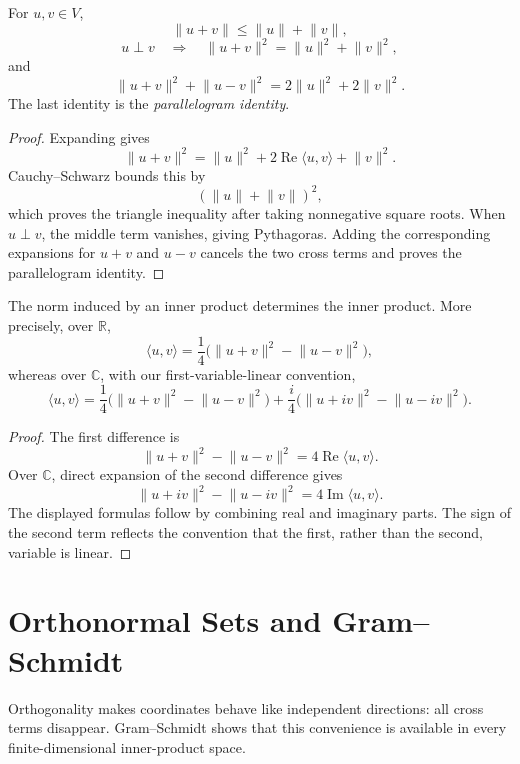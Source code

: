 \begin{proposition}
For \(u,v\in V\),
\[
\lVert u+v\rVert\leq\lVert u\rVert+\lVert v\rVert,
\]
\[
u\perp v
\quad\Longrightarrow\quad
\lVert u+v\rVert^2=\lVert u\rVert^2+\lVert v\rVert^2,
\]
and
\[
\lVert u+v\rVert^2+\lVert u-v\rVert^2
=2\lVert u\rVert^2+2\lVert v\rVert^2.
\]
The last identity is the \emph{parallelogram identity}.
\end{proposition}
\begin{proof}
Expanding gives
\[
\lVert u+v\rVert^2
=\lVert u\rVert^2+2\operatorname{Re}\langle u,v\rangle+\lVert v\rVert^2.
\]
Cauchy--Schwarz bounds this by
\[
(\lVert u\rVert+\lVert v\rVert)^2,
\]
which proves the triangle inequality after taking nonnegative square roots.
When \(u\perp v\), the middle term vanishes, giving Pythagoras. Adding the
corresponding expansions for \(u+v\) and \(u-v\) cancels the two cross terms
and proves the parallelogram identity.
\end{proof}

\begin{proposition}[Polarization]
The norm induced by an inner product determines the inner product. More
precisely, over \(\mathbb R\),
\[
\langle u,v\rangle
=\frac14\bigl(\lVert u+v\rVert^2-\lVert u-v\rVert^2\bigr),
\]
whereas over \(\mathbb C\), with our first-variable-linear convention,
\[
\langle u,v\rangle
=\frac14\bigl(\lVert u+v\rVert^2-\lVert u-v\rVert^2\bigr)
+\frac{i}{4}\bigl(\lVert u+iv\rVert^2-\lVert u-iv\rVert^2\bigr).
\]
\end{proposition}
\begin{proof}
The first difference is
\[
\lVert u+v\rVert^2-\lVert u-v\rVert^2
=4\operatorname{Re}\langle u,v\rangle.
\]
Over \(\mathbb C\), direct expansion of the second difference gives
\[
\lVert u+iv\rVert^2-\lVert u-iv\rVert^2
=4\operatorname{Im}\langle u,v\rangle.
\]
The displayed formulas follow by combining real and imaginary parts. The
sign of the second term reflects the convention that the first, rather than
the second, variable is linear.
\end{proof}

\section{Orthonormal Sets and Gram--Schmidt}

Orthogonality makes coordinates behave like independent directions: all cross
terms disappear. Gram--Schmidt shows that this convenience is available in
every finite-dimensional inner-product space.

